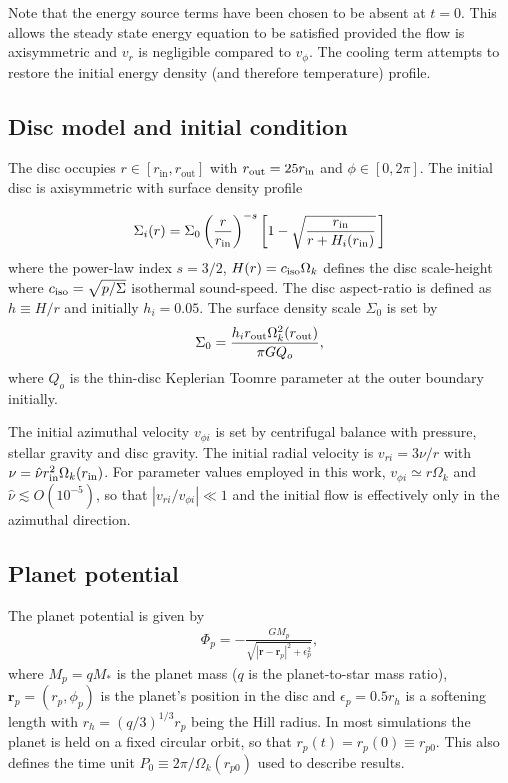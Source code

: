 Note that the energy source terms have been chosen to be absent 
at $t=0$. This allows the steady state energy equation to be satisfied
provided the flow is axisymmetric and $v_r$ is negligible compared to $v_\phi$.  
The cooling term attempts 
to restore the initial energy density (and therefore temperature) profile. 


\subsection{Disc model and initial condition}
The disc occupies $r\in[r_\mathrm{in}, r_\mathrm{out}]$ with $r_\mathrm{out} =
25r_\mathrm{in}$ and $\phi\in[0,2\pi]$. The initial disc is axisymmetric with
surface density profile  
 
\begin{align}\label{initial_density}
   \Sigma_i(r) = \Sigma_0\left(\frac{r}{r_\mathrm{in}}\right)^{-s}
    \left[1 - \sqrt{\frac{r_\mathrm{in}}{r + H_i(r_\mathrm{in})}}\,\right] 
\end{align}
where the power-law index $s=3/2$, $H(r) = c_\mathrm{iso}\Omega_k $ defines the disc scale-height 
where $c_\mathrm{iso}=\sqrt{p/\Sigma}$ isothermal sound-speed. The disc aspect-ratio is defined as $h\equiv H/r$ and initially
$h_i=0.05$. The surface density scale $\Sigma_0$ is set by  
\begin{align}
\Sigma_0 = \frac{h_ir_\mathrm{out}\Omega_k^2(r_\mathrm{out})}{\pi G Q_o},
\end{align}
where $Q_o$ is the thin-disc Keplerian Toomre parameter at the outer boundary initially. 

The initial azimuthal velocity $v_{\phi i}$ is set by centrifugal balance with
pressure, stellar gravity and disc gravity. The initial radial velocity is $v_{r i}=3\nu/r$ 
with $\nu = \hat{\nu}r_\mathrm{in}^2\Omega_k(r_\mathrm{in})$. For parameter values employed in this work, $v_{\phi i}\simeq r\Omega_k$ 
and $\hat{\nu}\lesssim O(10^{-5})$, so that $|v_{r i}/v_{\phi i}|\ll1$ and the initial 
flow is effectively only in the azimuthal direction. 


\subsection{Planet potential}\label{planet_config}
The planet potential is given by
\begin{align}
\Phi_p = -\frac{GM_p}{\sqrt{|\bm{r} - \bm{r}_p|^2 + \epsilon_p^2}},
\end{align}
where $M_p=qM_*$ is the planet mass ($q$ is the planet-to-star mass ratio), $\bm{r}_p=(r_p,\phi_p)$ is the planet's 
position in the disc and $\epsilon_p=0.5r_h$ is a softening length with $r_h=(q/3)^{1/3}r_p$ being the Hill radius. 
In most simulations the planet is held on a fixed circular orbit, so that $r_p(t) = r_p(0) \equiv r_{p0}$. This also
defines the time unit $P_0\equiv 2\pi/\Omega_k(r_{p0})$ used to describe results. 

